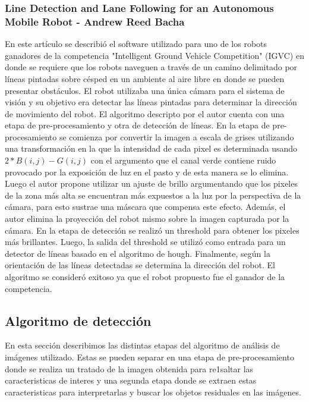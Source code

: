 	\subsubsection{Line Detection and Lane Following for an Autonomous Mobile Robot - Andrew Reed Bacha}
	En este artículo se describió el software utilizado para uno de los robots ganadores de la competencia "Intelligent Ground Vehicle Competition" (IGVC) en donde se requiere que los robots naveguen  a través de un camino delimitado por líneas pintadas sobre césped en un ambiente al aire libre en donde se pueden presentar obstáculos. El robot utilizaba una única cámara para el sistema de visión y su objetivo era detectar las líneas pintadas 
para determinar la dirección de movimiento del robot. El algoritmo 
descripto por el autor cuenta con una etapa de pre-procesamiento y otra 
de detección de líneas. En la etapa de pre-procesamiento se comienza 
por convertir la imagen a escala de grises utilizando una 
transformación en la que la intensidad de cada pixel es determinada 
usando $2*B(i,j) - G(i,j)$ con el argumento que el canal verde contiene 
ruido provocado por la exposición de luz en el pasto y de esta manera 
se lo elimina. Luego el autor propone utilizar un ajuste de brillo 
argumentando que los pixeles de la zona más alta se encuentran más 
expuestos a la luz por la perspectiva de la cámara, para esto sustrae 
una máscara que compensa este efecto. Además, el autor elimina la 
proyección del robot mismo sobre la imagen capturada por la cámara. 
En la etapa de detección se realizó un threshold para obtener los pixeles más brillantes. Luego, la salida del threshold se utilizó como entrada para un detector de líneas basado en el algoritmo de hough. Finalmente, según la orientación de las líneas detectadas se determina la dirección del robot. El algoritmo se consideró exitoso ya que el robot propuesto fue el ganador de la competencia.
\pagebreak

	
\subsection{Algoritmo de detección}
En esta sección describimos las distintas etapas del algoritmo de análisis 
de imágenes utilizado. Estas se pueden separar en una etapa de 
pre-procesamiento donde se realiza un tratado de la imagen obtenida 
para re1saltar las caracteristicas de interes y  una segunda etapa donde se 
extraen estas caracteristicas para interpretarlas y  buscar 
los objetos residuales en las imágenes.

